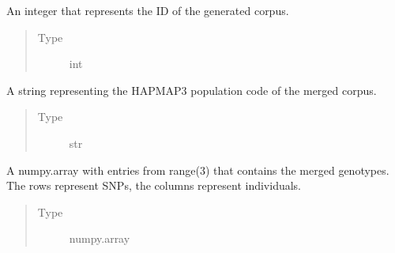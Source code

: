 \documentclass[a4paper,10pt,english]{sphinxhowto}
\begin{document}
\begin{fulllineitems}
\begin{fulllineitems}
\end{fulllineitems}


\begin{fulllineitems}
\label{\detokenize{utils:utils.genotype_corpus_merger.GenotypeCorpusMerger.corpus_id}}
An integer that represents the ID of the generated corpus.
\begin{quote}\begin{description}
\item[{Type}] \leavevmode
int

\end{description}\end{quote}

\end{fulllineitems}


\begin{fulllineitems}
\label{\detokenize{utils:utils.genotype_corpus_merger.GenotypeCorpusMerger.pop}}
A string representing the HAPMAP3 population code of the merged corpus.
\begin{quote}\begin{description}
\item[{Type}] \leavevmode
str

\end{description}\end{quote}

\end{fulllineitems}


\begin{fulllineitems}
\label{\detokenize{utils:utils.genotype_corpus_merger.GenotypeCorpusMerger.genotype}}
A numpy.array with entries from range(3) that contains the merged genotypes.
The rows represent SNPs, the columns represent individuals.
\begin{quote}\begin{description}
\item[{Type}] \leavevmode
numpy.array


\end{description}
\end{quote}
\end{fulllineitems}
\end{fulllineitems}
\end{document}
